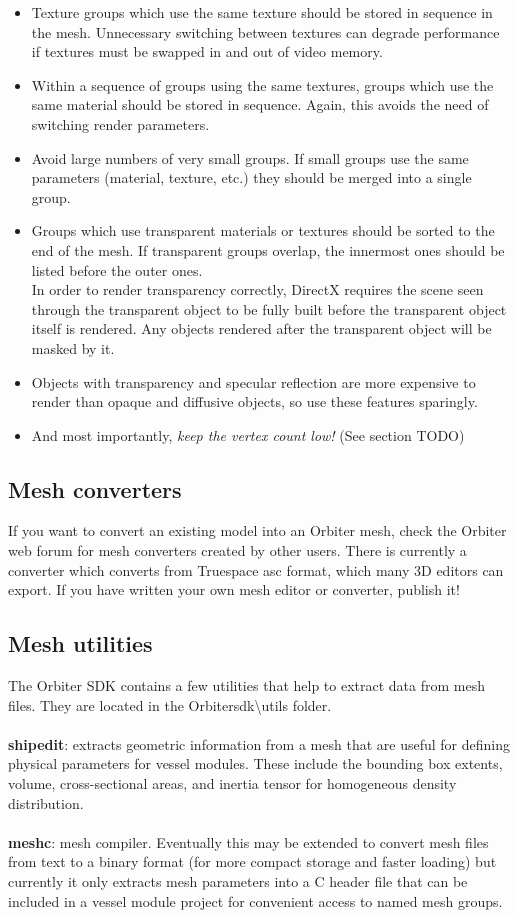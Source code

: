 \documentclass[Orbiter Developer Manual.tex]{subfiles}
\begin{document}
\begin{itemize}
\item Texture groups which use the same texture should be stored in sequence in the mesh. Unnecessary switching between textures can degrade performance if textures must be swapped in and out of video memory.
\item Within a sequence of groups using the same textures, groups which use the same material should be stored in sequence. Again, this avoids the need of switching render parameters.
\item Avoid large numbers of very small groups. If small groups use the same parameters (material, texture, etc.) they should be merged into a single group.
\item Groups which use transparent materials or textures should be sorted to the end of the mesh. If transparent groups overlap, the innermost ones should be listed before the outer ones.\\
In order to render transparency correctly, DirectX requires the scene seen through the transparent object to be fully built before the transparent object itself is rendered. Any objects rendered after the transparent object will be masked by it.
\item Objects with transparency and specular reflection are more expensive to render than opaque and diffusive objects, so use these features sparingly.
\item And most importantly, \textit{keep the vertex count low!} (See section TODO)
\end{itemize}


\subsection{Mesh converters}
If you want to convert an existing model into an Orbiter mesh, check the Orbiter web forum for mesh converters created by other users. There is currently a converter which converts from Truespace asc format, which many 3D editors can export. If you have written your own mesh editor or converter, publish it!


\subsection{Mesh utilities}
The Orbiter SDK contains a few utilities that help to extract data from mesh files. They are located in the Orbitersdk\textbackslash utils folder.\\
\\
\textbf{shipedit}: extracts geometric information from a mesh that are useful for defining physical parameters for vessel modules. These include the bounding box extents, volume, cross-sectional areas, and inertia tensor for homogeneous density distribution.\\
\\
\textbf{meshc}: mesh compiler. Eventually this may be extended to convert mesh files from text to a binary format (for more compact storage and faster loading) but currently it only extracts mesh parameters into a C header file that can be included in a vessel module project for convenient access to named mesh groups.
\end{document}

